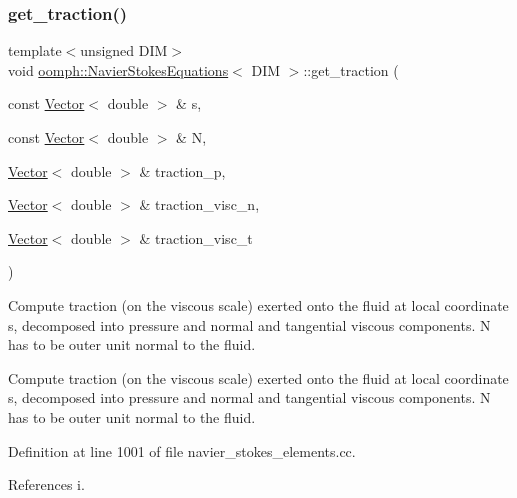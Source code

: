 \subsubsection{\texorpdfstring{get\+\_\+traction()}{get\_traction()}\hspace{0.1cm}{\footnotesize\ttfamily [2/2]}}
{\footnotesize\ttfamily template$<$unsigned D\+IM$>$ \\
void \hyperlink{classoomph_1_1NavierStokesEquations}{oomph\+::\+Navier\+Stokes\+Equations}$<$ D\+IM $>$\+::get\+\_\+traction (\begin{DoxyParamCaption}\item[{const \hyperlink{classoomph_1_1Vector}{Vector}$<$ double $>$ \&}]{s,  }\item[{const \hyperlink{classoomph_1_1Vector}{Vector}$<$ double $>$ \&}]{N,  }\item[{\hyperlink{classoomph_1_1Vector}{Vector}$<$ double $>$ \&}]{traction\+\_\+p,  }\item[{\hyperlink{classoomph_1_1Vector}{Vector}$<$ double $>$ \&}]{traction\+\_\+visc\+\_\+n,  }\item[{\hyperlink{classoomph_1_1Vector}{Vector}$<$ double $>$ \&}]{traction\+\_\+visc\+\_\+t }\end{DoxyParamCaption})}



Compute traction (on the viscous scale) exerted onto the fluid at local coordinate s, decomposed into pressure and normal and tangential viscous components. N has to be outer unit normal to the fluid. 

Compute traction (on the viscous scale) exerted onto the fluid at local coordinate s, decomposed into pressure and normal and tangential viscous components. N has to be outer unit normal to the fluid. 

Definition at line 1001 of file navier\+\_\+stokes\+\_\+elements.\+cc.



References i.

\mbox{\label{classoomph_1_1NavierStokesEquations_a113a52ef23061f08c4b40c2ae1a5a14f}} 
